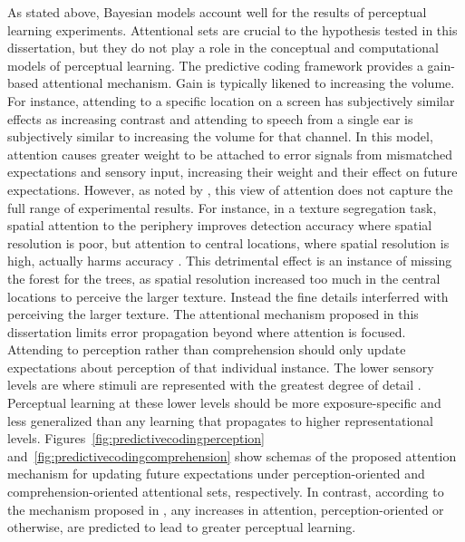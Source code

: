 As stated above, Bayesian models account well for the results of perceptual learning experiments.
Attentional sets are crucial to the hypothesis tested in this dissertation, but they do not play a role in the conceptual and computational models of perceptual learning.
The predictive coding framework \citep{Clark2013} provides a gain-based attentional mechanism. 
Gain is typically likened to increasing the volume.
For instance, attending to a specific location on a screen has subjectively similar effects as increasing contrast \citep{Ling2006} and attending to speech from a single ear is subjectively similar to increasing the volume for that channel. 
In this model, attention causes greater weight to be attached to error signals from mismatched expectations and sensory input, increasing their weight and their effect on future expectations.  
However, as noted by \citet{Block2013}, this view of attention does not capture the full range of experimental results.  
For instance, in a texture segregation task, spatial attention to the periphery improves detection accuracy where spatial resolution is poor, but attention to central locations, where spatial resolution is high, actually harms accuracy \citep{Yeshurun1998}.  
This detrimental effect is an instance of missing the forest for the trees, as spatial resolution increased too much in the central locations to perceive the larger texture.
Instead the fine details interferred with perceiving the larger texture.
The attentional mechanism proposed in this dissertation limits error propagation beyond where attention is focused.
Attending to perception rather than comprehension should only update expectations about perception of that individual instance.
The lower sensory levels are where stimuli are represented with the greatest degree of detail \citep{Gilbert2001}.
Perceptual learning at these lower levels should be more exposure-specific and less generalized than any learning that propagates to higher representational levels.
Figures~\ref{fig:predictivecodingperception} and~\ref{fig:predictivecodingcomprehension} show schemas of the proposed attention mechanism for updating future expectations under perception-oriented and comprehension-oriented attentional sets, respectively.
In contrast, according to the mechanism proposed in \citet{Clark2013}, any increases in attention, perception-oriented or otherwise, are predicted to lead to greater perceptual learning.



